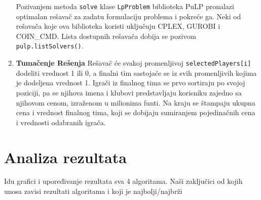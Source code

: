 \documentclass[a4paper]{article}
\begin{document}
\begin{enumerate}
  Pozivanjem metoda \texttt{solve} klase \texttt{LpProblem} biblioteka PuLP pronalazi optimalan rešavač za zadatu formulaciju problema i pokreće ga. Neki od rešavača koje ova biblioteka koristi uključuju CPLEX, GUROBI i COIN\_CMD. Lista dostupnih rešavača dobija se pozivom \texttt{pulp.listSolvers()}.
  \item  \textbf{Tumačenje Rešenja} \newline \newline
  Rešavač će svakoj promenljivoj \texttt{selectedPlayers[i]} dodeliti vrednost 1 ili 0, a finalni tim sastojaće se iz svih promenljivih kojima je dodeljena vrednost 1. Igrači iz finalnog tima se prvo sortiraju po svojoj poziciji, pa se njihova imena i klubovi predstavljaju korisniku zajedno sa njihovom cenom, izraženom u milionima funti. Na kraju se štampaju ukupna cena i vrednost finalnog tima, koji se dobijaju sumiranjem pojedinačnih cena i vrednosti odabranih igrača.
\end{enumerate} 






\section{Analiza rezultata}
Idu grafici i upoređivanje rezultata sva 4 algoritama.
Naši zaključici od kojih unosa zavisi rezultati algoritama i koji je najbolji/najbrži


\appendix
 


\appendix
\end{document}
